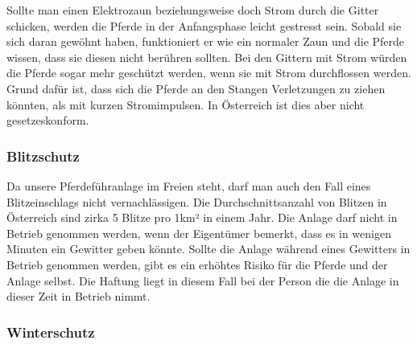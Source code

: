 \documentclass[12pt]{scrartcl}
\begin{document}
Sollte man einen Elektrozaun beziehungsweise doch Strom durch die Gitter schicken, werden die Pferde in der Anfangsphase leicht gestresst sein. Sobald sie sich daran gewöhnt haben, funktioniert er wie ein normaler Zaun und die Pferde wissen, dass sie diesen nicht berühren sollten.
Bei den Gittern mit Strom würden die Pferde sogar mehr geschützt werden, wenn sie mit Strom durchflossen werden. Grund dafür ist, dass sich die Pferde an den Stangen Verletzungen zu ziehen könnten, als mit kurzen Stromimpulsen. In Österreich ist dies aber nicht gesetzeskonform.

\subsubsection{Blitzschutz}
\label{sec:blitzschutz}

Da unsere Pferdeführanlage im Freien steht, darf man auch den Fall eines Blitzeinschlags nicht vernachlässigen. 
Die Durchschnittsanzahl von Blitzen in Österreich sind zirka 5 Blitze pro 1km² in einem Jahr. 
Die Anlage darf nicht in Betrieb genommen werden, wenn der Eigentümer bemerkt, 
dass es in wenigen Minuten ein Gewitter geben könnte.
 Sollte die Anlage während eines Gewitters in Betrieb genommen werden, 
gibt es ein erhöhtes Risiko für die Pferde und der Anlage selbst.
 Die Haftung liegt in diesem Fall bei der Person die die Anlage in dieser Zeit in Betrieb nimmt.

\subsubsection{Winterschutz}
\label{sec:winterschutz}
\end{document}
